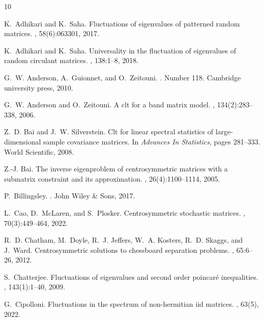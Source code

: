 \documentclass[12pt]{amsart}
\theoremstyle{plain}
\theoremstyle{definition}
\begin{document}
\begin{thebibliography}{10}

K.~Adhikari and K.~Saha.
\newblock Fluctuations of eigenvalues of patterned random matrices.
, 58(6):063301, 2017.

K.~Adhikari and K.~Saha.
\newblock Universality in the fluctuation of eigenvalues of random circulant
  matrices.
, 138:1--8, 2018.

G.~W. Anderson, A.~Guionnet, and O.~Zeitouni.
.
\newblock Number 118. Cambridge university press, 2010.

G.~W. Anderson and O.~Zeitouni.
\newblock A clt for a band matrix model.
, 134(2):283--338, 2006.

Z.~D. Bai and J.~W. Silverstein.
\newblock Clt for linear spectral statistics of large-dimensional sample
  covariance matrices.
\newblock In {\em Advances In Statistics}, pages 281--333. World Scientific,
  2008.

Z.-J. Bai.
\newblock The inverse eigenproblem of centrosymmetric matrices with a submatrix
  constraint and its approximation.
,
  26(4):1100--1114, 2005.

P.~Billingsley.
.
\newblock John Wiley \& Sons, 2017.

L.~Cao, D.~McLaren, and S.~Plosker.
\newblock Centrosymmetric stochastic matrices.
, 70(3):449--464, 2022.

R.~D. Chatham, M.~Doyle, R.~J. Jeffers, W.~A. Kosters, R.~D. Skaggs, and
  J.~Ward.
\newblock Centrosymmetric solutions to chessboard separation problems.
, 65:6--26, 2012.

S.~Chatterjee.
\newblock Fluctuations of eigenvalues and second order poincar{\'e}
  inequalities.
, 143(1):1--40, 2009.

G.~Cipolloni.
\newblock Fluctuations in the spectrum of non-hermitian iid matrices.
, 63(5), 2022.


\end{thebibliography}
\end{document}
